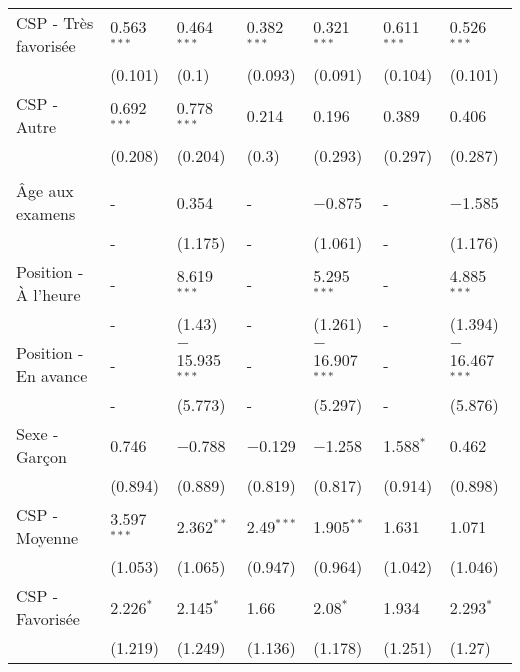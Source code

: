 \documentclass[
]{book}
\begin{document}
\begin{ThreePartTable}
\begin{longtable}[t]{lllllll}
\hspace{1em}CSP - Très favorisée & 0.563$^{***}$ & 0.464$^{***}$ & 0.382$^{***}$ & 0.321$^{***}$ & 0.611$^{***}$ & 0.526$^{***}$\\
\hspace{1em} & (0.101) & (0.1) & (0.093) & (0.091) & (0.104) & (0.101)\\
\hspace{1em}CSP - Autre & 0.692$^{***}$ & 0.778$^{***}$ & 0.214 & 0.196 & 0.389 & 0.406\\
\hspace{1em} & (0.208) & (0.204) & (0.3) & (0.293) & (0.297) & (0.287)\\
\addlinespace[0.3em]
\multicolumn{7}{l}{\textbf{Moyenne chez les pairs}}\\
\hspace{1em}Âge aux examens & - & 0.354 & - & $-$0.875 & - & $-$1.585\\
\hspace{1em} & - & (1.175) & - & (1.061) & - & (1.176)\\
\hspace{1em}Position - À l'heure & - & 8.619$^{***}$ & - & 5.295$^{***}$ & - & 4.885$^{***}$\\
\hspace{1em} & - & (1.43) & - & (1.261) & - & (1.394)\\
\hspace{1em}Position - En avance & - & $-$15.935$^{***}$ & - & $-$16.907$^{***}$ & - & $-$16.467$^{***}$\\
\hspace{1em} & - & (5.773) & - & (5.297) & - & (5.876)\\
\hspace{1em}Sexe - Garçon & 0.746 & $-$0.788 & $-$0.129 & $-$1.258 & 1.588$^{*}$ & 0.462\\
\hspace{1em} & (0.894) & (0.889) & (0.819) & (0.817) & (0.914) & (0.898)\\
\hspace{1em}CSP - Moyenne & 3.597$^{***}$ & 2.362$^{**}$ & 2.49$^{***}$ & 1.905$^{**}$ & 1.631 & 1.071\\
\hspace{1em} & (1.053) & (1.065) & (0.947) & (0.964) & (1.042) & (1.046)\\
\hspace{1em}CSP - Favorisée & 2.226$^{*}$ & 2.145$^{*}$ & 1.66 & 2.08$^{*}$ & 1.934 & 2.293$^{*}$\\
\hspace{1em} & (1.219) & (1.249) & (1.136) & (1.178) & (1.251) & (1.27)\\

\end{longtable}
\end{ThreePartTable}
\end{document}
